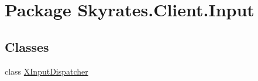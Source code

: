 \hypertarget{namespace_skyrates_1_1_client_1_1_input}{\section{Package Skyrates.\-Client.\-Input}
\label{namespace_skyrates_1_1_client_1_1_input}
}
\subsection*{Classes}
\begin{DoxyCompactItemize}
\item 
class \hyperlink{class_skyrates_1_1_client_1_1_input_1_1_x_input_dispatcher}{X\-Input\-Dispatcher}
\end{DoxyCompactItemize}

